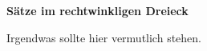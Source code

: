 \documentclass[11pt]{exam}
\newcommand{\theme}{Sätze im rechtwinkligen Dreieck}
\begin{document}
\fontsize{14}{14}\selectfont
\begin{center}
    \huge\bf\theme
\end{center}

\begin{questions}
\question[2]
Irgendwas sollte hier vermutlich stehen.

\end{questions}
\end{document}
